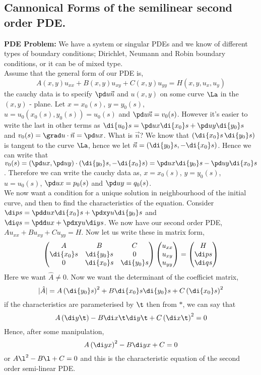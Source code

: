 \subsection{Cannonical Forms of the semilinear second order PDE.}


\textbf{PDE Problem: }We have a system or singular PDEs and we know of different types of boundary conditions; Dirichlet, Neumann and Robin boundary conditions, or it can be of mixed type.\\

\noindent
Assume that the general form of our PDE is,
$$ A(x, y)u_{xx} + B(x, y)u_{xy} + C(x, y)u_{yy} = H(x, y, u_x, u_y) $$
the cauchy data is to specify $\pd u {\vec n}$ and $u(x, y)$ on some curve $\La$ in the $(x, y)$ - plane. Let $x = x_0(s)$, $y = y_0(s)$, $u = u_0(x_0(s), y_0(s)) = u_0(s)$ and $\pd u {\vec n} = v_0(s)$. However it's easier to write the last in other terms as $\di {u_0} s = \pd u x \di {x_0} s + \pd u y \di {y_0} s$ and $v_0(s) = \grad u \cdot {\vec n} = \pd u x$. What is $\vec n$?
We know that $(\di {x_0} s\, \di {y_0} s)$ is tangent to the curve $\La$, hence we let $\vec n = (\di{y_0} s, -\di{x_0} s)$. Hence we can write that $v_0(s) = (\pd u x, \pd u y) \cdot (\di{y_0} s, -\di{x_0} s) = \pd u x \di{y_0}s - \pd u y \di{x_0} s$. Therefore we can write the cauchy data as, $x = x_0(s)$, $y = y_0(s)$, $u = u_0(s)$, $\pd u x = p_0(s)$ and $\pd u y = q_0(s)$.\\

\noindent
We now want a condition for a unique solution in neighbourhood of the initial curve, and then to find the characteristics of the equation. Consider $\di p s = \pdd u x \di {x_0} s + \pdxy u \di {y_0} s$ and $\di q s = \pdd u x + \pdxy u \di y s$. We now have our second order PDE, $Au_{xx} + Bu_{xy} + Cu_{yy} = H$. Now let us write these in matrix form,
$$ \begin{pmatrix}
  A & B & C \\
  \di {x_0} s & \di {y_0} s & 0 \\ 0 & \di {x_0} s & \di {y_0} s
\end{pmatrix} \begin{pmatrix}
  u_{xx} \\ u_{xy} \\ u_{yy}
\end{pmatrix} = \begin{pmatrix}
  H \\ \di p s \\ \di q s
\end{pmatrix} $$
Here we want $\hat A \ne 0$. Now we want the determinant of the coefficiet matrix,
$$ |\hat A| = A\left(\di {y_0} s\right)^2 + B\di {x_0} s \di {y_0} s + C\left(\di {x_0} s\right)^2 $$
if the characteristics are parameterised by $\t$ then from $*$, we can say that
$$ A\left(\di y \t\right) - B\di x \t \di y \t + C\left(\di x \t\right)^2 =0 $$
Hence, after some manipulation,
$$ A\left(\di y x\right)^2 - B\di y x + C = 0 $$
or $A\l^2 - B\l + C = 0$ and this is the characteristic equation of the second order semi-linear PDE.

